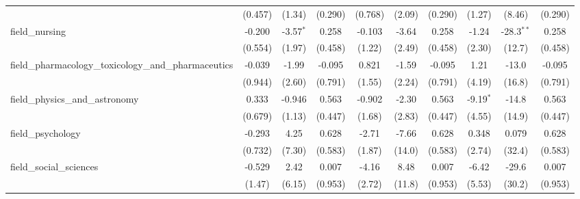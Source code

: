 \begin{tabular}{lccccccccc}
                                                               & (0.457)       & (1.34)        & (0.290)        & (0.768)       & (2.09)       & (0.290)        & (1.27)       & (8.46)       & (0.290)\\   
   field\_nursing                                              & -0.200        & -3.57$^{*}$   & 0.258          & -0.103        & -3.64        & 0.258          & -1.24        & -28.3$^{**}$ & 0.258\\   
                                                               & (0.554)       & (1.97)        & (0.458)        & (1.22)        & (2.49)       & (0.458)        & (2.30)       & (12.7)       & (0.458)\\   
   field\_pharmacology\_toxicology\_and\_pharmaceutics         & -0.039        & -1.99         & -0.095         & 0.821         & -1.59        & -0.095         & 1.21         & -13.0        & -0.095\\   
                                                               & (0.944)       & (2.60)        & (0.791)        & (1.55)        & (2.24)       & (0.791)        & (4.19)       & (16.8)       & (0.791)\\   
   field\_physics\_and\_astronomy                              & 0.333         & -0.946        & 0.563          & -0.902        & -2.30        & 0.563          & -9.19$^{*}$  & -14.8        & 0.563\\   
                                                               & (0.679)       & (1.13)        & (0.447)        & (1.68)        & (2.83)       & (0.447)        & (4.55)       & (14.9)       & (0.447)\\   
   field\_psychology                                           & -0.293        & 4.25          & 0.628          & -2.71         & -7.66        & 0.628          & 0.348        & 0.079        & 0.628\\   
                                                               & (0.732)       & (7.30)        & (0.583)        & (1.87)        & (14.0)       & (0.583)        & (2.74)       & (32.4)       & (0.583)\\   
   field\_social\_sciences                                     & -0.529        & 2.42          & 0.007          & -4.16         & 8.48         & 0.007          & -6.42        & -29.6        & 0.007\\   
                                                               & (1.47)        & (6.15)        & (0.953)        & (2.72)        & (11.8)       & (0.953)        & (5.53)       & (30.2)       & (0.953)\\   

\end{tabular}
